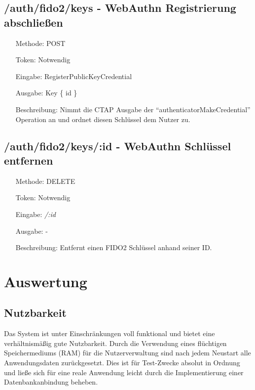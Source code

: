 \documentclass[journal]{IEEEtran}
\begin{document}
\subsection{/auth/fido2/keys - WebAuthn Registrierung abschließen}

\begin{itemize}
	\setlength{\leftskip}{1.5cm}
	\setlength{\itemsep}{0pt}
	\item[Methode:] POST
	\item[Token:] Notwendig
	\item[Eingabe:] RegisterPublicKeyCredential 
	\item[Ausgabe:] Key \{ id \}
	\item[Beschreibung:] Nimmt die CTAP Ausgabe der
		``authenticatorMakeCredential'' Operation an und ordnet diesen
		Schlüssel dem Nutzer zu.
\end{itemize}

\subsection{/auth/fido2/keys/:id - WebAuthn Schlüssel entfernen}

\begin{itemize}
	\setlength{\leftskip}{1.5cm}
	\setlength{\itemsep}{0pt}
	\item[Methode:] DELETE
	\item[Token:] Notwendig
	\item[Eingabe:] \textit{/:id}
	\item[Ausgabe:] -
	\item[Beschreibung:] Entfernt einen FIDO2 Schlüssel anhand seiner ID.\@
\end{itemize}

\section{Auswertung}

\subsection{Nutzbarkeit}

Das System ist unter Einschränkungen voll funktional und bietet eine
verhältnismäßig gute Nutzbarkeit. Durch die Verwendung eines flüchtigen
Speichermediums (RAM) für die Nutzerverwaltung sind nach jedem Neustart alle
Anwendungsdaten zurückgesetzt. Dies ist für Test-Zwecke absolut in Ordnung und
ließe sich für eine reale Anwendung leicht durch die Implementierung einer
Datenbankanbindung beheben.
\end{document}
